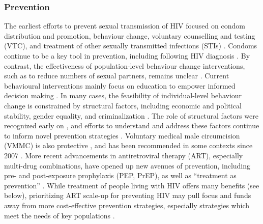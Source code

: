 \subsubsection{Prevention}\label{intro.hiv.resp.prev}
The earliest efforts to prevent sexual transmission of HIV focused on
condom distribution and promotion, behaviour change, voluntary counselling and testing (VTC),
and treatment of other sexually transmitted infections (STIs) \cite{Royce1997,Marseille2002}.
Condoms continue to be a key tool in prevention,
including following HIV diagnosis \cite{Tiwari2020}.
By contrast, the effectiveness of population-level behaviour change interventions,
such as to reduce numbers of sexual partners, remains unclear \cite{Gregson2009}.
Current behavioural interventions mainly focus on
education to empower informed decision making \cite{Faust2018}.
In many cases, the feasibility of individual-level behaviour change
is constrained by structural factors, including
economic and political stability, gender equality, and criminalization \cite{Gupta2008}.
The role of structural factors were recognized early on \cite{Parker2000},
and efforts to understand and address these factors continue to inform novel prevention strategies
\cite{Gupta2008,Beyrer2012,McBride2021}.
Voluntary medical male circumcision (VMMC) is also protective \cite{Auvert2005},
and has been recommended in some contexts since 2007 \cite{WHO2020vmmc}.
More recent advancements in antiretroviral therapy (ART), especially multi-drug combinations,
have opened up new avenues of prevention, including
pre- and post-exposure prophylaxis (PEP, PrEP), as well as
``treatment as prevention'' \cite{Hosseinipour2002}.
While treatment of people living with HIV offers many benefits
(see  below),
prioritizing ART scale-up for preventing HIV
may pull focus and funds away from more cost-effective prevention strategies,
especially strategies which meet the needs of key populations
\cite{Shelton2010,Cohen2012,Baral2019}.
